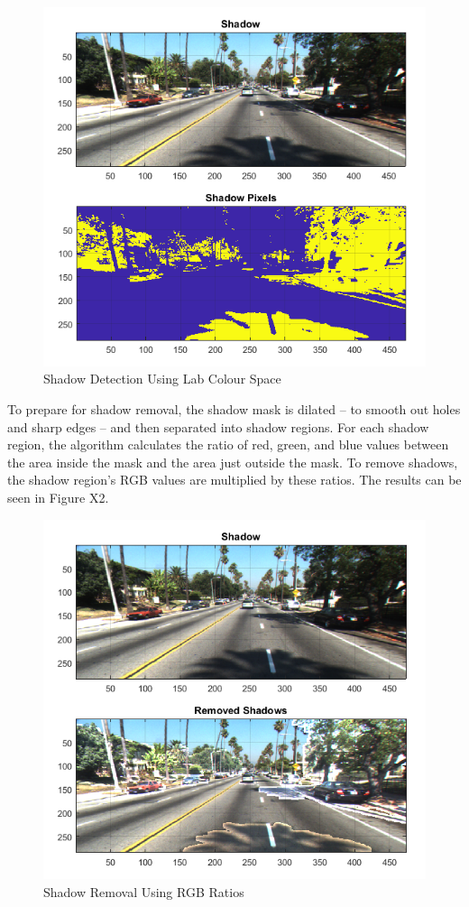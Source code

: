 \documentclass[11pt,journal]{IEEEtran}
\begin{document}
\begin{figure}[h]
\centerline{\includegraphics[width=0.9\columnwidth]{X1.png}}
\caption{Shadow Detection Using Lab Colour Space}
\label{Shadow1}
\end{figure}

To prepare for shadow removal, the shadow mask is dilated – to smooth out holes and sharp edges – and then separated into shadow regions. For each shadow region, the algorithm calculates the ratio of red, green, and blue values between the area inside the mask and the area just outside the mask. To remove shadows, the shadow region's RGB values are multiplied by these ratios. The results can be seen in Figure X2.

\begin{figure}[ht]
\centerline{\includegraphics[width=0.9\columnwidth]{X2.png}}
\caption{Shadow Removal Using RGB Ratios}
\label{Shadow2}
\end{figure}
\end{document}
